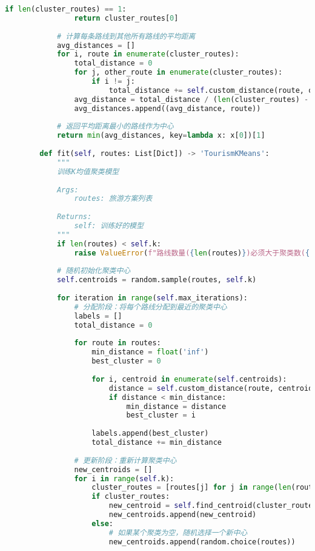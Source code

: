 \begin{lstlisting}[language=Python]
            if len(cluster_routes) == 1:
                return cluster_routes[0]
            
            # 计算每条路线到其他所有路线的平均距离
            avg_distances = []
            for i, route in enumerate(cluster_routes):
                total_distance = 0
                for j, other_route in enumerate(cluster_routes):
                    if i != j:
                        total_distance += self.custom_distance(route, other_route)
                avg_distance = total_distance / (len(cluster_routes) - 1)
                avg_distances.append((avg_distance, route))
            
            # 返回平均距离最小的路线作为中心
            return min(avg_distances, key=lambda x: x[0])[1]
        
        def fit(self, routes: List[Dict]) -> 'TourismKMeans':
            """
            训练K均值聚类模型
            
            Args:
                routes: 旅游方案列表
                
            Returns:
                self: 训练好的模型
            """
            if len(routes) < self.k:
                raise ValueError(f"路线数量({len(routes)})必须大于聚类数({self.k})")
            
            # 随机初始化聚类中心
            self.centroids = random.sample(routes, self.k)
            
            for iteration in range(self.max_iterations):
                # 分配阶段：将每个路线分配到最近的聚类中心
                labels = []
                total_distance = 0
                
                for route in routes:
                    min_distance = float('inf')
                    best_cluster = 0
                    
                    for i, centroid in enumerate(self.centroids):
                        distance = self.custom_distance(route, centroid)
                        if distance < min_distance:
                            min_distance = distance
                            best_cluster = i
                    
                    labels.append(best_cluster)
                    total_distance += min_distance
                
                # 更新阶段：重新计算聚类中心
                new_centroids = []
                for i in range(self.k):
                    cluster_routes = [routes[j] for j in range(len(routes)) if labels[j] == i]
                    if cluster_routes:
                        new_centroid = self.find_centroid(cluster_routes)
                        new_centroids.append(new_centroid)
                    else:
                        # 如果某个聚类为空，随机选择一个新中心
                        new_centroids.append(random.choice(routes))
                

\end{lstlisting}
